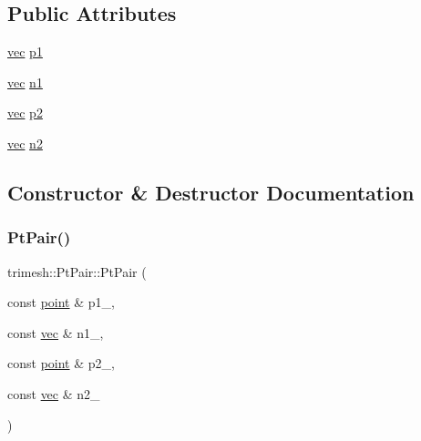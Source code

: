 \subsection*{Public Attributes}
\begin{DoxyCompactItemize}
\item 
\hyperlink{namespacetrimesh_a4fc2b83feba99c931f837a0c7d4b4df1}{vec} \hyperlink{structtrimesh_1_1PtPair_aea44cf2ca1df0811bde0492d52e4cf7a}{p1}
\item 
\hyperlink{namespacetrimesh_a4fc2b83feba99c931f837a0c7d4b4df1}{vec} \hyperlink{structtrimesh_1_1PtPair_a6c3b1065cb3a9ed70249eef0e5147c88}{n1}
\item 
\hyperlink{namespacetrimesh_a4fc2b83feba99c931f837a0c7d4b4df1}{vec} \hyperlink{structtrimesh_1_1PtPair_a25cf832b7c1e770e4c3de3cb3b80532d}{p2}
\item 
\hyperlink{namespacetrimesh_a4fc2b83feba99c931f837a0c7d4b4df1}{vec} \hyperlink{structtrimesh_1_1PtPair_aa4995639dff136290d4034041475deb2}{n2}
\end{DoxyCompactItemize}


\subsection{Constructor \& Destructor Documentation}
\mbox{\label{structtrimesh_1_1PtPair_aa30b38ab6c70ab6ce20b6a308a124a50}} 
\subsubsection{\texorpdfstring{Pt\+Pair()}{PtPair()}}
{\footnotesize\ttfamily trimesh\+::\+Pt\+Pair\+::\+Pt\+Pair (\begin{DoxyParamCaption}\item[{const \hyperlink{namespacetrimesh_a325b99fd6454b22fa4c4bc3223271b2c}{point} \&}]{p1\+\_\+,  }\item[{const \hyperlink{namespacetrimesh_a4fc2b83feba99c931f837a0c7d4b4df1}{vec} \&}]{n1\+\_\+,  }\item[{const \hyperlink{namespacetrimesh_a325b99fd6454b22fa4c4bc3223271b2c}{point} \&}]{p2\+\_\+,  }\item[{const \hyperlink{namespacetrimesh_a4fc2b83feba99c931f837a0c7d4b4df1}{vec} \&}]{n2\+\_\+ }\end{DoxyParamCaption})\hspace{0.3cm}{\ttfamily [inline]}}



